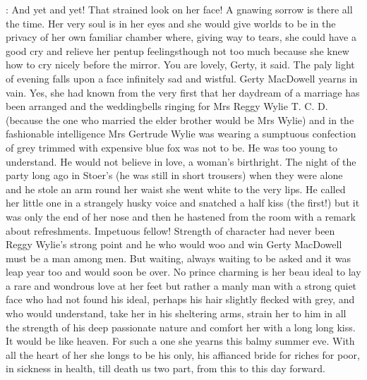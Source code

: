 :
And yet and yet! That strained look on her face! A gnawing sorrow is
there all the time. Her very soul is in her eyes and she would give worlds
to be in the privacy of her own familiar chamber where, giving way to
tears, she could have a good cry and relieve her pentup feelingsthough not
too much because she knew how to cry nicely before the mirror. You are
lovely, Gerty, it said. The paly light of evening falls upon a face
infinitely sad and wistful. Gerty MacDowell yearns in vain. Yes, she had
known from the very first that her daydream of a marriage has been
arranged and the weddingbells ringing for Mrs Reggy Wylie T. C. D.
(because the one who married the elder brother would be Mrs Wylie) and in
the fashionable intelligence Mrs Gertrude Wylie was wearing a sumptuous
confection of grey trimmed with expensive blue fox was not to be. He was
too young to understand. He would not believe in love, a woman's
birthright. The night of the party long ago in Stoer's (he was still in
short trousers) when they were alone and he stole an arm round her waist
she went white to the very lips. He called her little one in a strangely
husky voice and snatched a half kiss (the first!) but it was only the end
of her nose and then he hastened from the room with a remark about
refreshments. Impetuous fellow! Strength of character had never been Reggy
Wylie's strong point and he who would woo and win Gerty MacDowell must be
a man among men. But waiting, always waiting to be asked and it was leap
year too and would soon be over. No prince charming is her beau ideal to
lay a rare and wondrous love at her feet but rather a manly man with a
strong quiet face who had not found his ideal, perhaps his hair slightly
flecked with grey, and who would understand, take her in his sheltering
arms, strain her to him in all the strength of his deep passionate nature
and comfort her with a long long kiss. It would be like heaven. For such
a one she yearns this balmy summer eve. With all the heart of her she
longs to be his only, his affianced bride for riches for poor, in sickness
in health, till death us two part, from this to this day forward.

